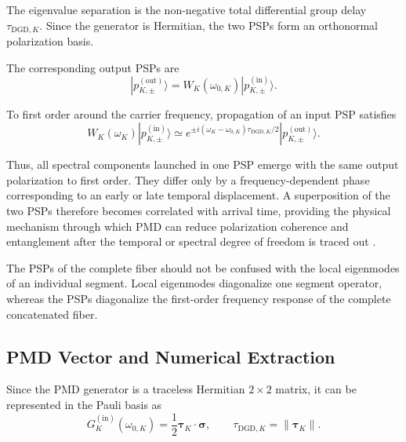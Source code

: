 The eigenvalue separation is the non-negative total differential group delay
\(\tau_{\mathrm{DGD},K}\). Since the generator is Hermitian, the two PSPs
form an orthonormal polarization basis.

The corresponding output PSPs are
%
\begin{equation}
    |p_{K,\pm}^{(\mathrm{out})}\rangle
    =
    W_K(\omega_{0,K})
    |p_{K,\pm}^{(\mathrm{in})}\rangle.
    \label{eq:output_psps_from_input_psps}
\end{equation}

To first order around the carrier frequency, propagation of an input PSP
satisfies
%
\begin{equation}
    W_K(\omega_K)
    |p_{K,\pm}^{(\mathrm{in})}\rangle
    \simeq
    e^{
        \pm
        i(\omega_K-\omega_{0,K})
        \tau_{\mathrm{DGD},K}/2
    }
    |p_{K,\pm}^{(\mathrm{out})}\rangle.
    \label{eq:first_order_psp_propagation}
\end{equation}

Thus, all spectral components launched in one PSP emerge with the same
output polarization to first order. They differ only by a
frequency-dependent phase corresponding to an early or late temporal
displacement. A superposition of the two PSPs therefore becomes correlated
with arrival time, providing the physical mechanism through which PMD can
reduce polarization coherence and entanglement after the temporal or
spectral degree of freedom is traced out
\cite{poon_law_stochastic_pmd_2008,
riccardi_polarization_entanglement_distribution_2021}.

The PSPs of the complete fiber should not be confused with the local
eigenmodes of an individual segment. Local eigenmodes diagonalize one
segment operator, whereas the PSPs diagonalize the first-order frequency
response of the complete concatenated fiber.


\subsection{PMD Vector and Numerical Extraction}
\label{subsec:numerical_psp_dgd_extraction}

Since the PMD generator is a traceless Hermitian \(2\times2\) matrix, it can
be represented in the Pauli basis as
%
\begin{equation}
    G_K^{(\mathrm{in})}(\omega_{0,K})
    =
    \frac{1}{2}
    \boldsymbol{\tau}_K
    \cdot
    \boldsymbol{\sigma},
    \qquad
    \tau_{\mathrm{DGD},K}
    =
    \lVert\boldsymbol{\tau}_K\rVert.
    \label{eq:complete_pmd_vector_representation}
\end{equation}

